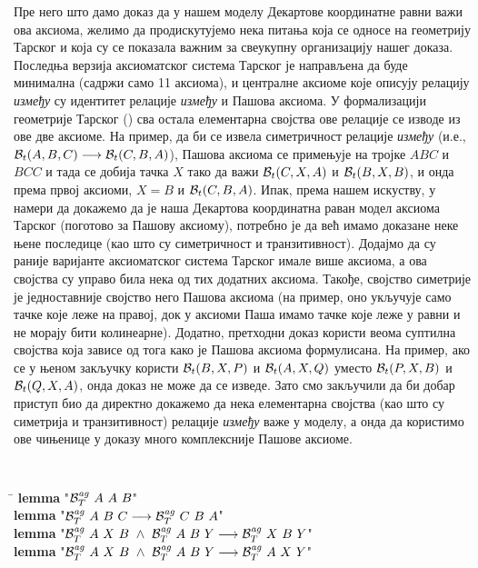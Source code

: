 Пре него што дамо доказ да у нашем моделу Декартове координатне равни
важи ова аксиома, желимо да продискутујемо нека питања која се односе
на геометрију Тарског и која су се показала важним за свеукупну
организацију нашег доказа. Последња верзија аксиоматског система
Тарског је направљена да буде минимална (садржи само 11 аксиома), и
централне аксиоме које описују релацију \emph{између} су идентитет
релације \emph{између} и Пашова аксиома. У формализацији геометрије
Тарског (\cite{narboux}) сва остала елементарна својства ове релације
се изводе из ове две аксиоме. На пример, да би се извела симетричност
релације \emph{између} (и.е., $\mathcal{B}_t(A, B, C) \longrightarrow
\mathcal{B}_t(C, B, A)$), Пашова аксиома се примењује на тројке $ABC$ и $BCC$
и тада се добија тачка $X$ тако да важи $\mathcal{B}_t(C, X, A)$ и
$\mathcal{B}_t(B, X, B)$, и онда према првој аксиоми, $X=B$ и
$\mathcal{B}_t(C, B, A)$. Ипак, према нашем искуству, у намери да докажемо да
је наша Декартова координатна раван модел аксиома Тарског (поготово за
Пашову аксиому), потребно је да већ имамо доказане неке њене последице
(као што су симетричност и транзитивност). Додајмо да су раније
варијанте аксиоматског система Тарског имале више аксиома, а ова
својства су управо била нека од тих додатних аксиома. Такође, својство
симетрије је једноставније својство него Пашова аксиома (на пример,
оно укључује само тачке које леже на правој, док у аксиоми Паша имамо
тачке које леже у равни и не морају бити колинеарне). Додатно,
претходни доказ користи веома суптилна својства која зависе од тога
како је Пашова аксиома формулисана. На пример, ако се у њеном закључку
користи $\mathcal{B}_t(B, X, P)$ и $\mathcal{B}_t(A, X, Q)$ уместо $\mathcal{B}_t(P, X, B)$ и
$\mathcal{B}_t(Q, X, A)$, онда доказ не може да се изведе. Зато смо закључили
да би добар приступ био да директно докажемо да нека елементарна
својства (као што су симетрија и транзитивност) релације \emph{између}
важе у моделу, а онда да користимо ове чињенице у доказу много
комплексније Пашове аксиоме.   {\tt
\begin{tabbing}
\hspace{5mm}\=\kill
\>\textbf{lemma} "$\mathcal{B}_T^{\mathit{ag}}\ A\ A\ B$"\\
\>\textbf{lemma} "$\mathcal{B}_T^{\mathit{ag}}\ A\ B\ C \longrightarrow \mathcal{B}_T^{\mathit{ag}}\ C\ B\ A$"\\
\>\textbf{lemma} "$\agbett{A}{X}{B}\ \wedge\ \agbett{A}{B}{Y} \longrightarrow \agbett{X}{B}{Y}$"\\
\>\textbf{lemma} "$\agbett{A}{X}{B}\ \wedge\ \agbett{A}{B}{Y} \longrightarrow \agbett{A}{X}{Y}$"
\end{tabbing}
}
